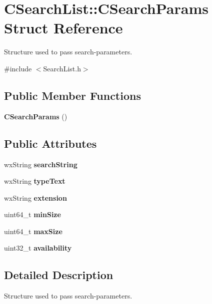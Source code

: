 \section{CSearchList::CSearchParams Struct Reference}
\label{structCSearchList_1_1CSearchParams}


Structure used to pass search-\/parameters.  


{\ttfamily \#include $<$SearchList.h$>$}\subsection*{Public Member Functions}
\begin{DoxyCompactItemize}
\item 
{\bf CSearchParams} ()
\end{DoxyCompactItemize}
\subsection*{Public Attributes}
\begin{DoxyCompactItemize}
\item 
wxString {\bf searchString}\label{structCSearchList_1_1CSearchParams_a359c479850e6fcb2b2124350a3f9721b}

\item 
wxString {\bf typeText}\label{structCSearchList_1_1CSearchParams_a3ffd638ef6f6f7b7920a724b12c4141e}

\item 
wxString {\bf extension}\label{structCSearchList_1_1CSearchParams_aefd974d1112e0583644ab989c0448341}

\item 
uint64\_\-t {\bf minSize}\label{structCSearchList_1_1CSearchParams_a3ef7e037aedfe7665f46c844a0149855}

\item 
uint64\_\-t {\bf maxSize}\label{structCSearchList_1_1CSearchParams_a776ed60dd6e96248c7808e9a3421c91e}

\item 
uint32\_\-t {\bf availability}\label{structCSearchList_1_1CSearchParams_a5eb6260ce57f415eb96c981a5dba1706}

\end{DoxyCompactItemize}


\subsection{Detailed Description}
Structure used to pass search-\/parameters. 


